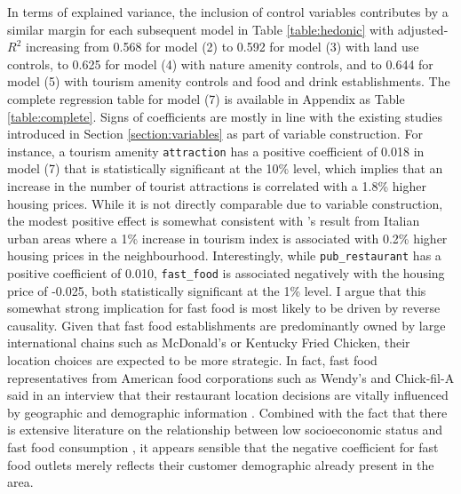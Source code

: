 \documentclass{article}
\begin{document}
In terms of explained variance, the inclusion of control variables contributes by a similar margin for each subsequent model in Table \ref{table:hedonic} with adjusted-$R^2$ increasing from 0.568 for model (2) to 0.592 for model (3) with land use controls, to 0.625 for model (4) with nature amenity controls, and to 0.644 for model (5) with tourism amenity controls and food and drink establishments. The complete regression table for model (7) is available in Appendix as Table \ref{table:complete}. Signs of coefficients are mostly in line with the existing studies introduced in Section \ref{section:variables} as part of variable construction. For instance, a tourism amenity \texttt{attraction} has a positive coefficient of 0.018 in model (7) that is statistically significant at the 10\% level, which implies that an increase in the number of tourist attractions is correlated with a 1.8\% higher housing prices. While it is not directly comparable due to variable construction, the modest positive effect is somewhat consistent with \citet{Biagi2015DoesItaly}'s result from Italian urban areas where a 1\% increase in tourism index is associated with 0.2\% higher housing prices in the neighbourhood. Interestingly, while \texttt{pub\_restaurant} has a positive coefficient of 0.010, \texttt{fast\_food} is associated negatively with the housing price of -0.025, both statistically significant at the 1\% level. I argue that this somewhat strong implication for fast food is most likely to be driven by reverse causality. Given that fast food establishments are predominantly owned by large international chains such as McDonald's or Kentucky Fried Chicken, their location choices are expected to be more strategic. In fact, fast food representatives from American food corporations such as Wendy's and Chick-fil-A said in an interview that their restaurant location decisions are vitally influenced by geographic and demographic information \citep{Ungerleider2014HowLocation}. Combined with the fact that there is extensive literature on the relationship between low socioeconomic status and fast food consumption \citep{Appelhans2012SocioeconomicPurchases.}, it appears sensible that the negative coefficient for fast food outlets merely reflects their customer demographic already present in the area.\\\\
\end{document}
